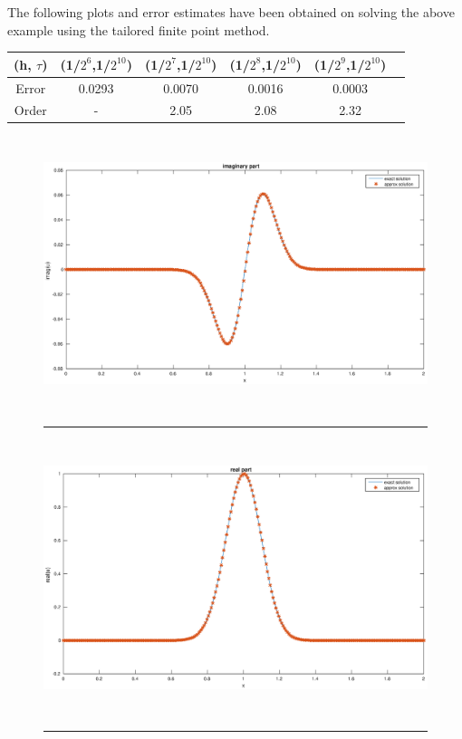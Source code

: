 The following plots and error estimates have been obtained on solving the above example using the tailored finite point method.\\

\begin{tabular}{|c|c|c|c|c|c|}
   \hline
   (h, $\tau$)  & (1/$2^{6}$,1/$2^{10}$)  & (1/$2^{7}$,1/$2^{10}$) & (1/$2^{8}$,1/$2^{10}$) &  (1/$2^{9}$,1/$2^{10}$)\\
  \hline
  Error  & 0.0293  & 0.0070 & 0.0016 &  0.0003\\
  \hline
  Order & -  &  2.05  & 2.08 & 2.32\\
\hline
\end{tabular}

\begin{figure}[htbp]
	\centering
		\includegraphics[height=8cm]{Figures/imag_RCTFPM2_2.eps}\\
		\rule{35em}{0.5pt}
	\caption[RCTFPM Real part]{}
\end{figure}

\begin{figure}[htbp]
	\centering
		\includegraphics[height=8cm]{Figures/real_RCTFPM2_2.eps}\\
		\rule{35em}{0.5pt}
	\caption[RCTFPM imaginary part]{}
\end{figure}
\clearpage

